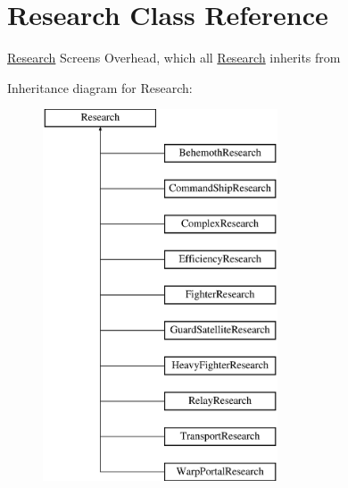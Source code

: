 \hypertarget{class_research}{}\section{Research Class Reference}
\label{class_research}


\hyperlink{class_research}{Research} Screens Overhead, which all \hyperlink{class_research}{Research} inherits from  


Inheritance diagram for Research\+:\begin{figure}[H]
\begin{center}
\leavevmode
\includegraphics[height=11.000000cm]{class_research}
\end{center}
\end{figure}
